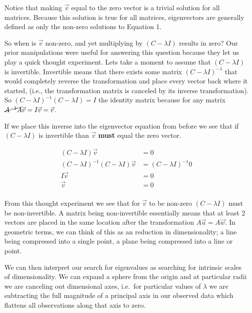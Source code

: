 \documentclass[
  letterpaper,
  DIV=11,
  numbers=noendperiod]{scrartcl}
\begin{document}
Notice that making \(\vec{v}\) equal to the zero vector is a trivial
solution for all matrices. Because this solution is true for all
matrices, eigenvectors are generally defined as only the non-zero
solutions to Equation 1.

So when is \(\vec{v}\) non-zero, and yet multiplying by
\((C - \lambda I)\) results in zero? Our prior manipulations were useful
for answering this question because they let us play a quick thought
experiment. Lets take a moment to assume that \((C - \lambda I)\) is
invertible. Invertible means that there exists some matrix
\((C - \lambda I)^{-1}\) that would completely reverse the
transformation and place every vector back where it started, (i.e., the
transformation matrix is canceled by its inverse transformation). So
\((C - \lambda I)^{-1}(C - \lambda I) = I\) the identity matrix because
for any matrix \(\cancel{A^{-1}A}\vec{v} = I\vec{v} = \vec{v}\).

If we place this inverse into the eigenvector equation from before we
see that if \((C - \lambda I)\) is invertible than \(\vec{v}\)
\textbf{must} equal the zero vector.

\begin{align*}
     (C - \lambda I)\vec{v} &= 0 \\
     (C - \lambda I)^{-1} (C - \lambda I)\vec{v} &= (C - \lambda I)^{-1}0 \\
    I\vec{v} &= 0 \\
    \vec{v} &= 0 \\
\end{align*}

From this thought experiment we see that for \(\vec{v}\) to be non-zero
\((C - \lambda I)\) must be non-invertible. A matrix being
non-invertible essentially means that at least 2 vectors are placed in
the same location after the transformation \(A\vec{u} = A\vec{w}\). In
geometric terms, we can think of this as an reduction in dimensionality;
a line being compressed into a single point, a plane being compressed
into a line or point.

We can then interpret our search for eigenvalues as searching for
intrinsic scales of dimensionality. We can expand a sphere from the
origin and at particular radii we are canceling out dimensional axes,
i.e.~for particular values of \(\lambda\) we are subtracting the full
magnitude of a principal axis in our observed data which flattens all
observations along that axis to zero.
\end{document}
